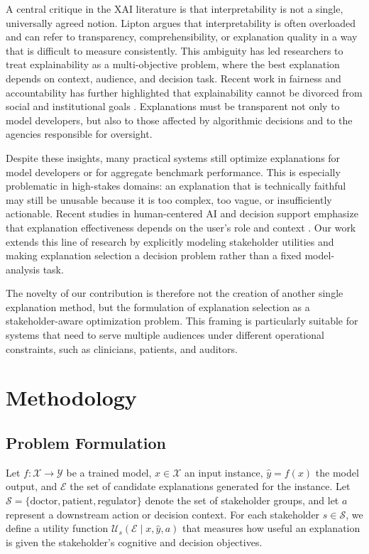 \documentclass{article}
\begin{document}
A central critique in the XAI literature is that interpretability is not a single, universally agreed notion. Lipton \citep{lipton2018} argues that interpretability is often overloaded and can refer to transparency, comprehensibility, or explanation quality in a way that is difficult to measure consistently. This ambiguity has led researchers to treat explainability as a multi-objective problem, where the best explanation depends on context, audience, and decision task. Recent work in fairness and accountability has further highlighted that explainability cannot be divorced from social and institutional goals \citep{barocas2017}. Explanations must be transparent not only to model developers, but also to those affected by algorithmic decisions and to the agencies responsible for oversight.

Despite these insights, many practical systems still optimize explanations for model developers or for aggregate benchmark performance. This is especially problematic in high-stakes domains: an explanation that is technically faithful may still be unusable because it is too complex, too vague, or insufficiently actionable. Recent studies in human-centered AI and decision support emphasize that explanation effectiveness depends on the user's role and context \citep{miller2019, doshi2017}. Our work extends this line of research by explicitly modeling stakeholder utilities and making explanation selection a decision problem rather than a fixed model-analysis task.

The novelty of our contribution is therefore not the creation of another single explanation method, but the formulation of explanation selection as a stakeholder-aware optimization problem. This framing is particularly suitable for systems that need to serve multiple audiences under different operational constraints, such as clinicians, patients, and auditors.

\section{Methodology}

\subsection{Problem Formulation}

Let $f: \mathcal{X} \rightarrow \mathcal{Y}$ be a trained model, $x \in \mathcal{X}$ an input instance, $\hat{y} = f(x)$ the model output, and $\mathcal{E}$ the set of candidate explanations generated for the instance. Let $\mathcal{S} = \{\text{doctor}, \text{patient}, \text{regulator}\}$ denote the set of stakeholder groups, and let $a$ represent a downstream action or decision context. For each stakeholder $s \in \mathcal{S}$, we define a utility function $\mathcal{U}_s(\mathcal{E} \mid x, \hat{y}, a)$ that measures how useful an explanation is given the stakeholder's cognitive and decision objectives.
\end{document}
